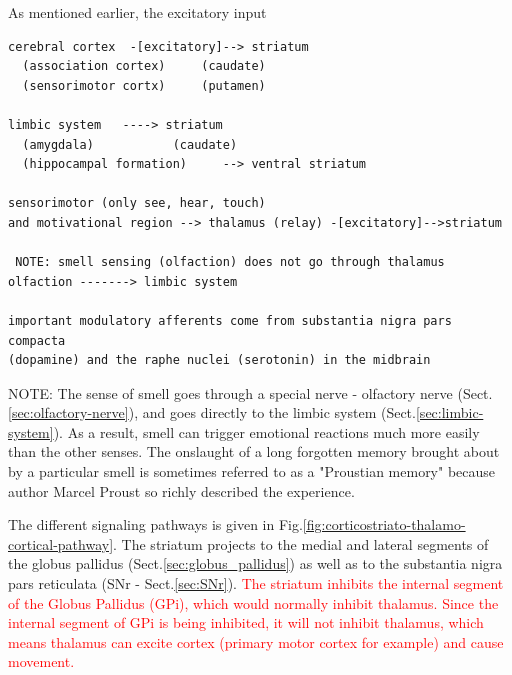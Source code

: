  


As mentioned earlier, the excitatory
input
\begin{verbatim}
cerebral cortex  -[excitatory]--> striatum
  (association cortex)     (caudate)
  (sensorimotor cortx)     (putamen)

limbic system   ----> striatum 
  (amygdala)           (caudate)        
  (hippocampal formation)     --> ventral striatum      
  
sensorimotor (only see, hear, touch) 
and motivational region --> thalamus (relay) -[excitatory]-->striatum

 NOTE: smell sensing (olfaction) does not go through thalamus
olfaction -------> limbic system

important modulatory afferents come from substantia nigra pars compacta
(dopamine) and the raphe nuclei (serotonin) in the midbrain
\end{verbatim}
NOTE: The sense of smell goes through a special nerve - olfactory nerve
(Sect.\ref{sec:olfactory-nerve}), and goes directly to the limbic system
(Sect.\ref{sec:limbic-system}). As a result, smell can trigger emotional
reactions much more easily than the other senses.
The onslaught of a long forgotten memory brought about by a particular smell is
sometimes referred to as a "Proustian memory" because author Marcel Proust so
richly described the experience.



The different signaling pathways is given in
Fig.\ref{fig:corticostriato-thalamo-cortical-pathway}.
The striatum projects to the medial and lateral segments of the globus pallidus
(Sect.\ref{sec:globus_pallidus}) as well as to the substantia nigra pars
reticulata (SNr - Sect.\ref{sec:SNr}).
\textcolor{red}{The striatum inhibits the internal segment of the Globus
Pallidus (GPi), which would normally inhibit thalamus.  Since the internal
segment of GPi is being inhibited, it will not inhibit thalamus, which means
thalamus can excite cortex (primary motor cortex for example) and cause
movement.}



